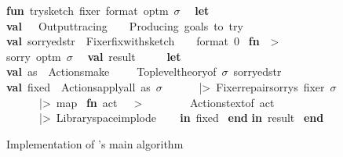 \documentclass[10pt,conference]{IEEEtran}
\newcommand{\isakw}[1]{{\bfseries\ttfamily\def\isachardot{.}\def\isacharunderscore{\isacharunderscorekeyword}%
\def\isacharbraceleft{\{}\def\isacharbraceright{\}}#1}}
\renewcommand{\isacommand}[1]{\textcolor{IsaBlue}{\isakw{#1}}}
\renewcommand{\isakeyword}[1]{\textcolor{IsaGreen}{\isakw{#1}}}
\begin{document}
\begin{figure}
\begin{isabellebody}
 \isacommand{fun}\ try{\isacharunderscore}sketch\ fixer\ format\ opt{\isacharunderscore}m\ $\sigma$\ {\isacharequal}\ \isakeyword{let}\ \ \isacommand{val}\ {\isacharunderscore}\ {\isacharequal}\ Output{\isachardot}tracing\ \ \ \ {\isachardoublequoteopen}Producing\ goals\ to\ try{\isachardot}{\isachardot}{\isachardot}{\isachardoublequoteclose}\ \ \isacommand{val}\ sorryed{\isacharunderscore}str\ {\isacharequal}\ Fixer{\isachardot}fix{\isacharunderscore}with{\isacharunderscore}sketch\ \ \ \ format\ 0\ {\isacharparenleft}\isacommand{fn}\ {\isacharunderscore}\ {\isacharequal}> {\isachardoublequoteopen}sorry{\isachardoublequoteclose}{\isacharparenright}\ opt{\isacharunderscore}m\ $\sigma${\isacharsemicolon}\ \ \isacommand{val}\ result\ {\isacharequal}\ \ \ \ \isakeyword{let}\ \ \ \ \ \ \isacommand{val}\ as\ {\isacharequal}\ Actions{\isachardot}make\ \ \ \ \ {\isacharparenleft}Toplevel{\isachardot}theory{\isacharunderscore}of\ $\sigma${\isacharparenright}\ sorryed{\isacharunderscore}str{\isacharsemicolon}\ \ \ \ \ \isacommand{val}\ fixed\ {\isacharequal}\ Actions{\isachardot}apply{\isacharunderscore}all\ as\ $\sigma$ \ \ \ \ \ \ |>\ Fixer{\isachardot}repair{\isacharunderscore}sorrys\ fixer\ $\sigma$ \ \ \ \ \ \ |>\ map\ {\isacharparenleft}\isacommand{fn}\ {\isacharparenleft}act{\isacharcomma}\ {\isacharunderscore}{\isacharcomma}\ {\isacharunderscore}{\isacharparenright}\ {\isacharequal}> \ \ \ \ \ \ \ \ Actions{\isachardot}text{\isacharunderscore}of\ act{\isacharparenright} \ \ \ \ \ \ |>\ Library{\isachardot}space{\isacharunderscore}implode\ {\isachardoublequoteopen}{\isachardoublequoteclose} \ \ \isakeyword{in}\ fixed\ \isakeyword{end} \isakeyword{in}\ result\ \isakeyword{end}{\isacharsemicolon}\isanewline
\end{isabellebody}
\caption{Implementation of \trysketch{}'s main algorithm}
\label{fig:sketch-listing}
\end{figure}
\end{document}
